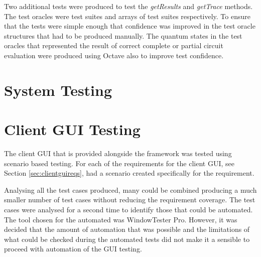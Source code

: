Two additional tests were produced to test the \emph{getResults} and \emph{getTrace} methods.
The test oracles were test suites and arrays of test suites respectively.
To ensure that the tests were simple enough that confidence was improved in the test oracle structures that had to be produced manually.
The quantum states in the test oracles that represented the result of correct complete or partial circuit evaluation were produced using Octave also to improve test confidence.

\section{System Testing}
\label{sec:systests}

\section{Client GUI Testing}
\label{sec:clientguitests}
The client GUI that is provided alongside the framework was tested using scenario based testing.
For each of the requirements for the client GUI, see Section \ref{sec:clientguireqs}, had a scenario created specifically for the requirement.

Analysing all the test cases produced, many could be combined producing a much smaller number of test cases without reducing the requirement coverage.
The test cases were analysed for a second time to identify those that could be automated.
The tool chosen for the automated was WindowTester Pro\cite{wintestproweb}.
However, it was decided that the amount of automation that was possible and the limitations of what could be checked during the automated tests did not make it a sensible to proceed with automation of the GUI testing.

